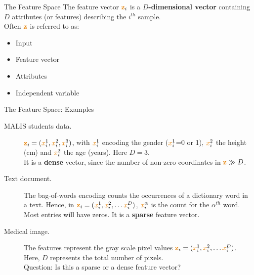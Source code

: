 \documentclass[aspectratio=169,10pt]{beamer}
\begin{document}
\begin{frame}{The Feature Space}
	The feature vector $\boldx_i$ is a \textbf{$D$-dimensional vector} containing $D$ attributes (or features)  describing the $i^{th}$ sample. \\
		
		\vspace{1cm}
	Often {$\boldx$} is referred to as:
	\begin{itemize}
		\item Input
		\item Feature vector
		\item Attributes
		\item Independent variable
	\end{itemize}
\end{frame}			
	

\begin{frame}{The Feature Space: Examples}	

	\begin{description}
		\item[MALIS students data.] $\boldx_i = (\smallx_i^{1}, \smallx_i^{2}, \smallx_i^{3})$, with $\smallx_i^{1}$ encoding the gender ($\smallx_i^{1}$=0 or 1), $\smallx_i^{2}$ the height (cm) and $\smallx_i^{2}$ the age (years). Here $D=3$.\\
	 It is a \textbf{dense} vector, since the number of non-zero coordinates in $\boldx \gg D$.
	 \pause
	 \vspace{0.4cm}
	 \item[Text document.] The bag-of-words encoding counts the occurrences of a dictionary word in a text. Hence, in $\boldx_i = (\smallx_i^{1}, \smallx_i^{2}, \ldots \smallx_i^{D})$, $\smallx_i^{\alpha}$ is the count for the $\alpha^{th}$ word.\\
	 Most entries will have zeros. It is a \textbf{sparse} feature vector.
	 \pause
	 \vspace{0.4cm}
	 \item[Medical image.] The features represent the gray scale pixel values $\boldx_i = (\smallx_i^{1}, \smallx_i^{2}, \ldots \smallx_i^{D})$. Here, $D$ represents the total number of pixels.\\
	 \alert{Question:} Is this a sparse or a dense feature vector? 
	\end{description}
\end{frame}
\end{document}
